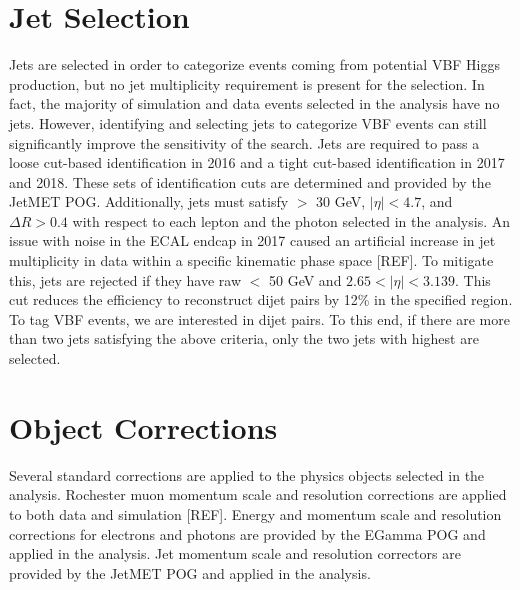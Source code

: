 \section{Jet Selection}
Jets are selected in order to categorize events coming from potential VBF Higgs production, but no jet multiplicity requirement is present 
for the \hzg selection. In fact, the majority of simulation and data events selected in the analysis have no jets. However, identifying 
and selecting jets to categorize VBF events can still significantly improve the sensitivity of the search. Jets are required to pass 
a loose cut-based identification in 2016 and a tight cut-based identification in 2017 and 2018. These sets of identification cuts are
determined and provided by the JetMET POG. Additionally, jets must satisfy \pT $>$ 30 GeV, $|\eta| < 4.7$, and $\Delta R > 0.4$ with 
respect to each lepton and the photon selected in the analysis. An issue with noise in the ECAL endcap in 2017 caused an artificial 
increase in jet multiplicity in data within a specific kinematic phase space [REF]. To mitigate this, jets are rejected if they have 
raw \pT $<$ 50 GeV and $2.65 < |\eta| < 3.139$. This cut reduces the efficiency to reconstruct dijet pairs by 12\% in the specified 
region. To tag VBF events, we are interested in dijet pairs. To this end, if there are more than two jets satisfying the above criteria, 
only the two jets with highest \pT are selected. 

\section{Object Corrections}
Several standard corrections are applied to the physics objects selected in the analysis. Rochester muon momentum scale and resolution 
corrections are applied to both data and simulation [REF]. Energy and momentum scale and resolution corrections for electrons 
and photons are provided by the EGamma POG and applied in the analysis. Jet momentum scale and resolution correctors are provided by 
the JetMET POG and applied in the analysis. 

